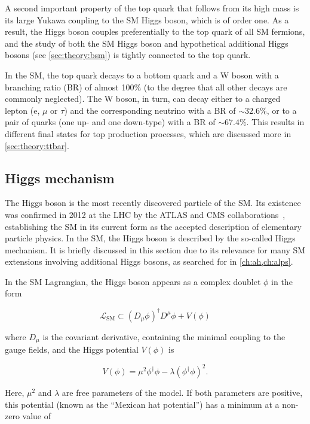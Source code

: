 A second important property of the top quark that follows from its high mass is its large Yukawa coupling to the SM Higgs boson, which is of order one. As a result, the Higgs boson couples preferentially to the top quark of all SM fermions, and the study of both the SM Higgs boson and hypothetical additional Higgs bosons (see \cref{sec:theory:bsm}) is tightly connected to the top quark. 

In the SM, the top quark decays to a bottom quark and a W boson with a branching ratio (BR) of almost 100\% (to the degree that all other decays are commonly neglected). The W boson, in turn, can decay either to a charged lepton (e, $\mu$ or $\tau$) and the corresponding neutrino with a BR of $\sim32.6\%$, or to a pair of quarks (one up- and one down-type) with a BR of $\sim67.4\%$. This results in different final states for top production processes, which are discussed more in \cref{sec:theory:ttbar}.

\subsection{Higgs mechanism}
\label{sec:theory:higgs}

The Higgs boson is the most recently discovered particle of the SM. Its existence was confirmed in 2012 at the LHC by the ATLAS and CMS collaborations~\cite{ATLAS:2012tfa,CMS:HIG-12-028,CMS:HIG-12-036}, establishing the SM in its current form as the accepted description of elementary particle physics. In the SM, the Higgs boson is described by the so-called Higgs mechanism. It is briefly discussed in this section due to its relevance for many SM extensions involving additional Higgs bosons, as searched for in \cref{ch:ah,ch:alps}.

In the SM Lagrangian, the Higgs boson appears as a complex doublet $\phi$ in the form

\begin{equation}
    \mathcal{L}_{\mathrm{SM}} \subset \left(D_\mu \phi\right)^\dagger D^\mu \phi + V(\phi)
\end{equation}

\noindent where $D_\mu$ is the covariant derivative, containing the minimal coupling to the gauge fields, and the Higgs potential $V(\phi)$ is 

\begin{equation}
    V(\phi) = \mu^2 \phi^\dagger \phi - \lambda (\phi^\dagger \phi)^2 .
\end{equation}

Here, $\mu^2$ and $\lambda$ are free parameters of the model. If both parameters are positive, this potential (known as the ``Mexican hat potential'') has a minimum at a non-zero value of

